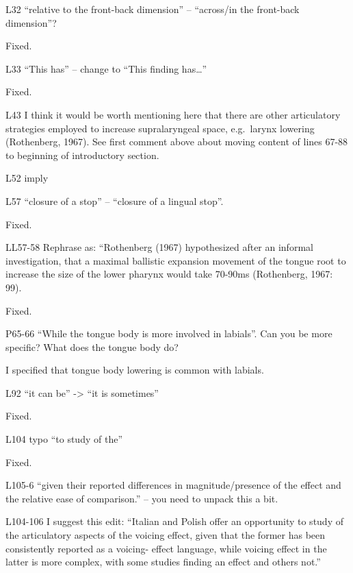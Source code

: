 \documentclass[]{article}
\begin{document}
L32 ``relative to the front-back dimension'' -- ``across/in the
front-back dimension''?

\color{plum}

Fixed. \color{black}

L33 ``This has'' -- change to ``This finding has\ldots{}''

\color{plum}

Fixed. \color{black}

L43 I think it would be worth mentioning here that there are other
articulatory strategies employed to increase supralaryngeal space,
e.g.~larynx lowering (Rothenberg, 1967). See first comment above about
moving content of lines 67-88 to beginning of introductory section.

L52 imply

L57 ``closure of a stop'' -- ``closure of a lingual stop''.

\color{plum}

Fixed. \color{black}

LL57-58 Rephrase as: ``Rothenberg (1967) hypothesized after an informal
investigation, that a maximal ballistic expansion movement of the tongue
root to increase the size of the lower pharynx would take 70-90ms
(Rothenberg, 1967: 99).

\color{plum}

Fixed. \color{black}

P65-66 ``While the tongue body is more involved in labials''. Can you be
more specific? What does the tongue body do?

\color{plum}

I specified that tongue body lowering is common with labials.
\color{black}

L92 ``it can be'' -\textgreater{} ``it is sometimes''

\color{plum}

Fixed. \color{black}

L104 typo ``to study of the''

\color{plum}

Fixed. \color{black}

L105-6 ``given their reported differences in magnitude/presence of the
effect and the relative ease of comparison.'' -- you need to unpack this
a bit.

L104-106 I suggest this edit: ``Italian and Polish offer an opportunity
to study of the articulatory aspects of the voicing effect, given that
the former has been consistently reported as a voicing- effect language,
while voicing effect in the latter is more complex, with some studies
finding an effect and others not.''
\end{document}
